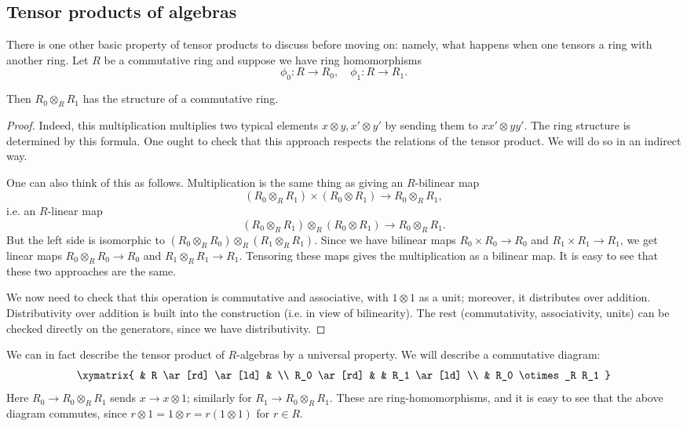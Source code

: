 \subsection{Tensor products of algebras}
There is one other basic property of tensor products to discuss before moving
on: namely, what happens when one tensors a ring with another ring.
Let $R$ be a commutative ring and suppose we have ring homomorphisms
\[ \phi_0: R \to R_0, \quad \phi_1: R \to R_1.  \]

\begin{proposition} 
Then $R_0 \otimes_R R_1$ has the structure of a commutative ring.
\end{proposition} 
\begin{proof}
 Indeed, this
multiplication multiplies two typical elements $x \otimes y, x' \otimes y'$ by
sending them to 
$xx' \otimes yy'$. 
The ring structure is determined by this formula.  One ought to check that this
approach respects the relations of the tensor product. We will do so in an
indirect way. 

One can also think of this as follows. Multiplication is the same thing as
giving an $R$-bilinear map
\[ (R_0 \otimes_R R_1) \times (R_0 \otimes R_1) \to R_0 \otimes_R R_1,\]
i.e. an $R$-linear map
\[ (R_0 \otimes_R R_1) \otimes_R (R_0 \otimes R_1) \to R_0 \otimes_R R_1.\]
But the left side is isomorphic to $(R_0 \otimes_R R_0) \otimes_R (R_1
\otimes_R R_1)$. Since we have bilinear maps $R_0 \times R_0 \to R_0$ and $R_1
\times R_1 \to R_1$, we get linear maps
$R_0 \otimes_R R_0 \to R_0$ and $R_1 \otimes_R R_1 \to R_1$. 
Tensoring these maps gives the multiplication as a bilinear map. It is easy to
see that these two approaches are the same.

We now need to check that this operation is commutative and associative, with
$1 \otimes 1$ as a unit; moreover, it distributes over addition. Distributivity
over addition is built into the construction (i.e. in view of bilinearity). The
rest (commutativity, associativity, units) can be checked directly on the generators, since we have distributivity. 
\end{proof}

We can in fact describe the tensor product of $R$-algebras by a universal property. We will
describe a commutative diagram:
\[ 
\xymatrix{
& R \ar[rd] \ar[ld] & \\
R_0 \ar[rd] & & R_1 \ar[ld] \\
& R_0 \otimes_R R_1
}
\]
Here $R_0 \to R_0 \otimes_R R_1$ sends $x \to x \otimes 1$; similarly for $R_1
\to R_0 \otimes_R R_1$. These are ring-homomorphisms, and it is easy to see that
the above
diagram commutes, since $r \otimes 1 = 1 \otimes r = r(1 \otimes 1)$ for $r \in
R$. 

